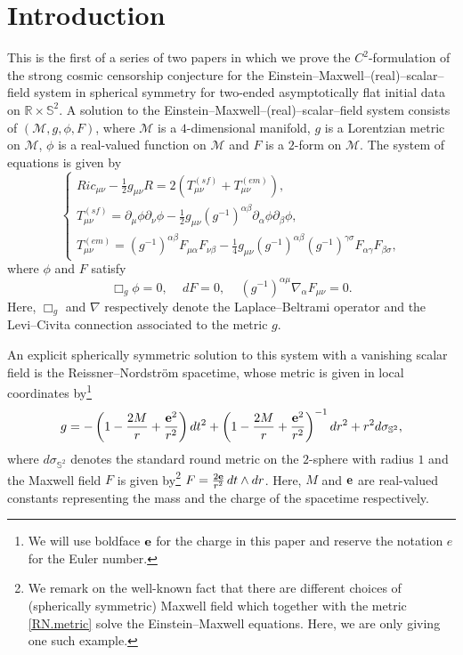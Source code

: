 \documentclass[10pt, reqno]{amsart}
\theoremstyle{definition}
\theoremstyle{remark}
\numberwithin{equation}{section}
\newcommand{\rd}{\partial}
\newcommand{\0}{\emptyset}
\newcommand{\alp}{\alpha}
\newcommand{\bt}{\beta}
\newcommand{\f}{\frac}
\newcommand{\nab}{\nabla}
\begin{document}
\maketitle

\tableofcontents

\section{Introduction}
This is the first of a series of two papers in which we prove the $C^2$-formulation of the strong cosmic censorship conjecture for the Einstein--Maxwell--(real)--scalar--field system in spherical symmetry for two-ended asymptotically flat initial data on $\mathbb R\times \mathbb S^2$. A solution to the Einstein--Maxwell--(real)--scalar--field system consists of $(\mathcal M,g,\phi,F)$, where $\mathcal M$ is a $4$-dimensional manifold, $g$ is a Lorentzian metric on $\mathcal M$, $\phi$ is a real-valued function on $\mathcal M$ and $F$ is a $2$-form on $\mathcal M$. The system of equations is given by
\begin{equation}\label{EMSFS}
\begin{cases}
Ric_{\mu\nu}-\f12 g_{\mu\nu} R=2(T^{(sf)}_{\mu\nu}+T^{(em)}_{\mu\nu}),\\
T^{(sf)}_{\mu\nu}=\rd_\mu\phi\rd_\nu\phi-\f 12 g_{\mu\nu} (g^{-1})^{\alp\beta}\rd_\alp\phi\rd_{\beta}\phi,\\
T^{(em)}_{\mu\nu}=(g^{-1})^{\alp\bt}F_{\mu\alp}F_{\nu\bt}-\f 14 g_{\mu\nu}(g^{-1})^{\alp\bt}(g^{-1})^{\gamma\sigma}F_{\alp\gamma}F_{\bt\sigma},
\end{cases}
\end{equation}
where $\phi$ and $F$ satisfy
$$\Box_g\phi=0,\,\quad dF=0,\,\quad (g^{-1})^{\alpha\mu}\nab_\alpha F_{\mu\nu}=0.$$
Here, $\Box_g$ and $\nab$ respectively denote the Laplace--Beltrami operator and the Levi--Civita connection associated to the metric $g$. 

An explicit spherically symmetric solution to this system with a vanishing scalar field is the Reissner--Nordstr\"om spacetime, whose metric is given in local coordinates by\footnote{We will use boldface ${\bf e}$ for the charge in this paper and reserve the notation $e$ for the Euler number.}
\begin{equation}\label{RN.metric}
g=-\left(1-\f {2M} r+\f{{\bf e}^2}{r^2}\right)dt^2+\left(1-\f {2M} r+\f{{\bf e}^2}{r^2}\right)^{-1} dr^2+r^2 d\sigma_{\mathbb S^2},
\end{equation}
where $d\sigma_{\mathbb S^2}$ denotes the standard round metric on the $2$-sphere with radius $1$ and the Maxwell field $F$ is given by\footnote{We remark on the well-known fact that there are different choices of (spherically symmetric) Maxwell field which together with the metric \eqref{RN.metric} solve the Einstein--Maxwell equations. Here, we are only giving one such example.} $F=\f{2{\bf e}}{r^2} \,dt\wedge dr$. Here, $M$ and ${\bf e}$ are real-valued constants representing the mass and the charge of the spacetime respectively.
\end{document}
